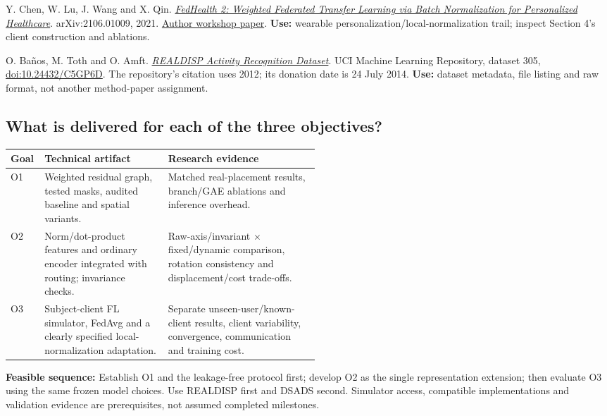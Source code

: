 \documentclass[10pt]{article}
\begin{document}
\begin{thebibliography}{99}
 Y. Chen, W. Lu, J. Wang and X. Qin.
\href{https://arxiv.org/abs/2106.01009}{\emph{FedHealth 2: Weighted Federated Transfer Learning via Batch Normalization for Personalized Healthcare}}.
arXiv:2106.01009, 2021.
\href{https://federated-learning.org/fl-ijcai-2021/FTL-IJCAI21_paper_4.pdf}{Author workshop paper}.
\textbf{Use:} wearable personalization/local-normalization trail; inspect Section 4's client construction and ablations.

 O. Ba\~nos, M. Toth and O. Amft.
\href{https://archive.ics.uci.edu/dataset/305/realdisp+activity+recognition+dataset}{\emph{REALDISP Activity Recognition Dataset}}.
UCI Machine Learning Repository, dataset 305, \href{https://doi.org/10.24432/C5GP6D}{doi:10.24432/C5GP6D}.
The repository's citation uses 2012; its donation date is 24 July 2014. \textbf{Use:} dataset metadata, file listing and raw format, not another method-paper assignment.

\end{thebibliography}
\endgroup

\subsection*{What is delivered for each of the three objectives?}
\begingroup
\small
\renewcommand{\arraystretch}{1.22}
\begin{tabularx}{\linewidth}{@{}>{\raggedright\arraybackslash}p{0.11\linewidth}>{\raggedright\arraybackslash}p{0.40\linewidth}X@{}}
\toprule
\textbf{Goal} & \textbf{Technical artifact} & \textbf{Research evidence}\\
\midrule
O1 & Weighted residual graph, tested masks, audited baseline and spatial variants. & Matched real-placement results, branch/GAE ablations and inference overhead.\\
O2 & Norm/dot-product features and ordinary encoder integrated with routing; invariance checks. & Raw-axis/invariant $\times$ fixed/dynamic comparison, rotation consistency and displacement/cost trade-offs.\\
O3 & Subject-client FL simulator, FedAvg and a clearly specified local-normalization adaptation. & Separate unseen-user/known-client results, client variability, convergence, communication and training cost.\\
\bottomrule
\end{tabularx}
\endgroup

\textbf{Feasible sequence:} Establish O1 and the leakage-free protocol first; develop O2 as the single representation extension; then evaluate O3 using the same frozen model choices. Use REALDISP first and DSADS second. Simulator access, compatible implementations and validation evidence are prerequisites, not assumed completed milestones.
\end{document}
